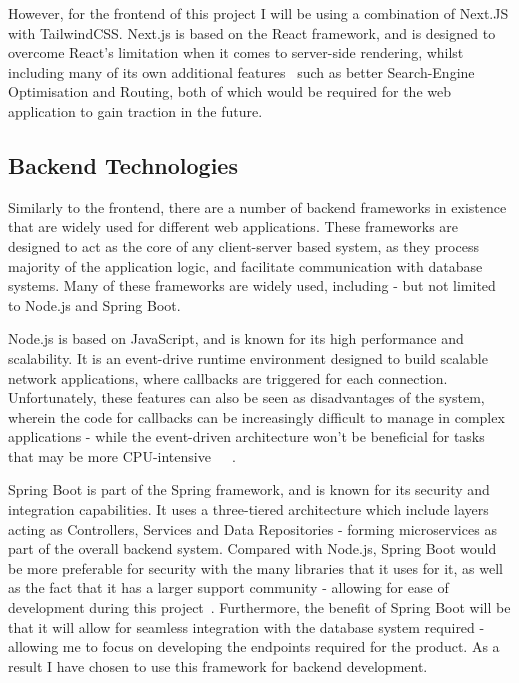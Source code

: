 \documentclass[]{final_report}
\begin{document}
However, for the frontend of this project I will be using a combination of Next.JS with TailwindCSS. Next.js is based on the React framework, and is designed to overcome React's limitation when it comes to server-side rendering, whilst including many of its own additional features~\cite{DB_NEXTJS} such as better Search-Engine Optimisation and Routing, both of which would be required for the web application to gain traction in the future.

\subsection {Backend Technologies}

Similarly to the frontend, there are a number of backend frameworks in existence that are widely used for different web applications. These frameworks are designed to act as the core of any client-server based system, as they process majority of the application logic, and facilitate communication with database systems. Many of these frameworks are widely used, including - but not limited to Node.js and Spring Boot.

Node.js is based on JavaScript, and is known for its high performance and scalability. It is an event-drive runtime environment designed to build scalable network applications, where callbacks are triggered for each connection. Unfortunately, these features can also be seen as disadvantages of the system, wherein the code for callbacks can be increasingly difficult to manage in complex applications - while the event-driven architecture won't be beneficial for tasks that may be more CPU-intensive~\cite{BACKEND_FRAMEWORKS_BLOG}~\cite{BACKEND_FRAMEWORKS_REPORT}~\cite{SPRING}.

Spring Boot is part of the Spring framework, and is known for its security and integration capabilities. It uses a three-tiered architecture which include layers acting as Controllers, Services and Data Repositories - forming microservices as part of the overall backend system. Compared with Node.js, Spring Boot would be more preferable for security with the many libraries that it uses for it, as well as the fact that it has a larger support community - allowing for ease of development during this project~\cite{SPRING}. Furthermore, the benefit of Spring Boot will be that it will allow for seamless integration with the database system required - allowing me to focus on developing the endpoints required for the product. As a result I have chosen to use this framework for backend development.
\end{document}
